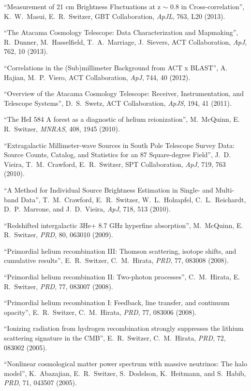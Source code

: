 \item ``Measurement of 21 cm Brightness Fluctuations at z $\sim$ 0.8 in Cross-correlation'', K.\, W.\, Masui, E.\, R.\, Switzer, GBT Collaboration, {\it ApJL}, 763, L20 (2013).
\item ``The Atacama Cosmology Telescope: Data Characterization and Mapmaking'', R.\, Dunner, M.\, Hasselfield, T.\, A.\, Marriage, J.\, Sievers, ACT Collaboration, {\it ApJ}, 762, 10 (2013).
\item ``Correlations in the (Sub)millimeter Background from ACT x BLAST'', A.\, Hajian, M.\, P.\, Viero, ACT Collaboration, {\it ApJ}, 744, 40 (2012).
\item ``Overview of the Atacama Cosmology Telescope: Receiver, Instrumentation, and Telescope Systems'', D.\, S.\, Swetz, ACT Collaboration, {\it ApJS}, 194, 41 (2011).
\item ``The HeI 584 A forest as a diagnostic of helium reionization'', M.\, McQuinn, E.\, R.\, Switzer, {\it MNRAS}, 408, 1945 (2010).
\item ``Extragalactic Millimeter-wave Sources in South Pole Telescope Survey Data: Source Counts, Catalog, and Statistics for an 87 Square-degree Field'', J.\, D.\, Vieira, T.\, M.\, Crawford, E.\, R.\, Switzer, SPT Collaboration, {\it ApJ}, 719, 763 (2010).
\item ``A Method for Individual Source Brightness Estimation in Single- and Multi-band Data'', T.\, M.\, Crawford, E.\, R.\, Switzer, W.\, L.\, Holzapfel, C.\, L.\, Reichardt, D.\, P.\, Marrone, and J.\, D.\, Vieira, {\it ApJ}, 718, 513 (2010).
\item ``Redshifted intergalactic 3He+ 8.7 GHz hyperfine absorption'', M.\, McQuinn, E.\, R.\, Switzer, {\it PRD}, 80, 063010 (2009).
\item ``Primordial helium recombination III: Thomson scattering, isotope shifts, and cumulative results'', E.\, R.\, Switzer, C.\, M.\, Hirata, {\it PRD}, 77, 083008 (2008).
\item ``Primordial helium recombination II: Two-photon processes'', C.\, M.\, Hirata, E.\, R.\, Switzer, {\it PRD}, 77, 083007 (2008).
\item ``Primordial helium recombination I: Feedback, line transfer, and continuum opacity'', E.\, R.\, Switzer, C.\, M.\, Hirata, {\it PRD}, 77, 083006 (2008).
\item ``Ionizing radiation from hydrogen recombination strongly suppresses the lithium scattering signature in the CMB'', E.\, R.\, Switzer, C.\, M.\, Hirata, {\it PRD}, 72, 083002 (2005).
\item ``Nonlinear cosmological matter power spectrum with massive neutrinos: The halo model'', K.\, Abazajian, E.\, R.\, Switzer, S.\, Dodelson, K.\, Heitmann, and S.\, Habib, {\it PRD}, 71, 043507 (2005).
